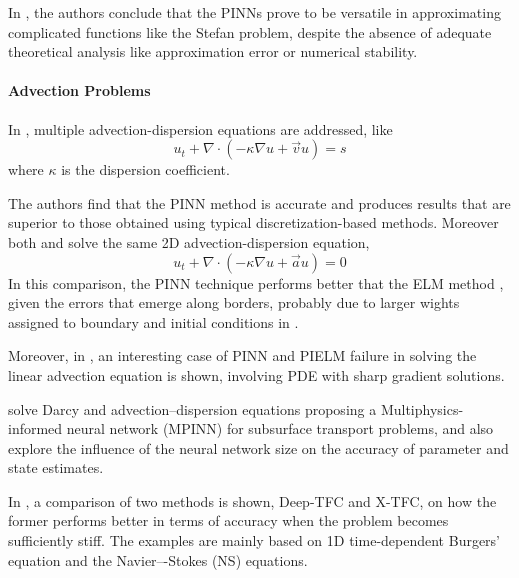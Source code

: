 \documentclass[pdflatex,sn-basic]{sn-jnl}%
\theoremstyle{thmstyleone}%
\theoremstyle{thmstyletwo}%
\theoremstyle{thmstylethree}%
\begin{document}
In \cite{Wan2021_DeepLearningFree_PerWP}, the authors conclude that the PINNs prove to be versatile in approximating complicated functions like the Stefan problem, despite the absence of adequate theoretical analysis like approximation error or numerical stability. 

\paragraph{Advection Problems}
In \cite{He2021_PhysicsInformedNeural_TarHT}, multiple advection-dispersion equations are addressed, like
\begin{equation*}
u_t + \nabla \cdot (-\kappa \nabla u + \vec{v} u)  = s
\end{equation*}
where $\kappa$ is the dispersion coefficient.

The authors find that the PINN method is accurate and produces results that are superior to those obtained using typical discretization-based methods. 
Moreover both \cite{Dwi2020_PhysicsInformedExtreme_SriDS} and \cite{He2021_PhysicsInformedNeural_TarHT}  solve the same 2D advection-dispersion equation,
\begin{equation*}
u_t + \nabla \cdot (-\kappa \nabla u + \vec{a} u) = 0
\end{equation*}
In this comparison, the PINN technique \citep{He2021_PhysicsInformedNeural_TarHT} performs better that the ELM method \citep{Dwi2020_PhysicsInformedExtreme_SriDS}, given the errors that emerge along borders, probably due to larger wights assigned to boundary and initial conditions in \cite{He2021_PhysicsInformedNeural_TarHT}.

Moreover, in \cite{Dwi2020_PhysicsInformedExtreme_SriDS}, an interesting case of PINN and PIELM failure in solving the linear advection equation is shown, involving PDE with sharp gradient solutions.

\cite{He2020_PhysicsInformedNeural_BarHBTT} solve Darcy and advection–dispersion equations proposing a Multiphysics-informed neural network  (MPINN) for subsurface transport problems, and also explore the influence of the neural network size on the accuracy of parameter and state estimates.

In \cite{Sch2021_ExtremeTheoryFunctional_FurSFL}, a comparison of two methods is shown, Deep-TFC and X-TFC, on how the former performs better in terms of accuracy when the problem becomes sufficiently stiff. The examples are mainly based on  1D time-dependent Burgers’ equation and the Navier–-Stokes (NS) equations.
\end{document}
